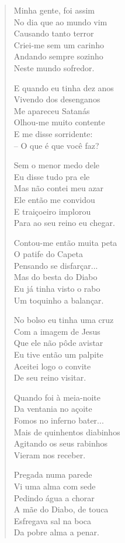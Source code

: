 \begin{verse}
Minha gente, foi assim\\
No dia que ao mundo vim\\
Causando tanto terror\\
Criei-me sem um carinho\\
Andando sempre sozinho\\
Neste mundo sofredor.


E quando eu tinha dez anos\\
Vivendo dos desenganos\\
Me apareceu Satanás\\
Olhou-me muito contente\\
E me disse sorridente:\\
– O que é que você faz?

Sem o menor medo dele\\
Eu disse tudo pra ele\\
Mas não contei meu azar\\
Ele então me convidou\\
E traiçoeiro implorou\\
Para ao seu reino eu chegar.

Contou-me então muita peta\\
O patife do Capeta\\
Pensando se disfarçar...\\
Mas do besta do Diabo\\
Eu já tinha visto o rabo\\
Um toquinho a balançar.

No bolso eu tinha uma cruz\\
Com a imagem de Jesus\\
Que ele não pôde avistar\\
Eu tive então um palpite\\
Aceitei logo o convite\\
De seu reino visitar.


Quando foi à meia-noite\\
Da ventania no açoite\\
Fomos no inferno bater...\\
Mais de quinhentos diabinhos\\
Agitando os seus rabinhos\\
Vieram nos receber.

Pregada numa parede\\
Vi uma alma com sede\\
Pedindo água a chorar\\
A mãe do Diabo, de touca\\
Esfregava sal na boca\\
Da pobre alma a penar.


\end{verse}

